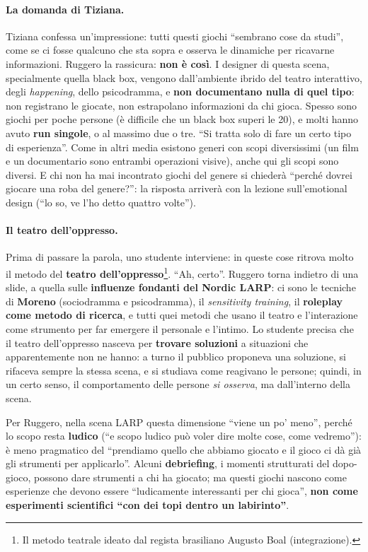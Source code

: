 \paragraph{La domanda di Tiziana.} Tiziana confessa un'impressione: tutti questi
giochi ``sembrano cose da studi'', come se ci fosse qualcuno che sta sopra e
osserva le dinamiche per ricavarne informazioni. Ruggero la rassicura: \textbf{non
è così}. I designer di questa scena, specialmente quella black box, vengono
dall'ambiente ibrido del teatro interattivo, degli \emph{happening}, dello
psicodramma, e \textbf{non documentano nulla di quel tipo}: non registrano le
giocate, non estrapolano informazioni da chi gioca. Spesso sono giochi per poche
persone (è difficile che un black box superi le 20), e molti hanno avuto
\textbf{run singole}, o al massimo due o tre. ``Si tratta solo di fare un certo
tipo di esperienza''. Come in altri media esistono generi con scopi diversissimi
(un film e un documentario sono entrambi operazioni visive), anche qui gli scopi
sono diversi. E chi non ha mai incontrato giochi del genere si chiederà
``perché dovrei giocare una roba del genere?'': la risposta arriverà con la
lezione sull'emotional design (``lo so, ve l'ho detto quattro volte'').

\paragraph{Il teatro dell'oppresso.} Prima di passare la parola, uno studente
interviene: in queste cose ritrova molto il metodo del \textbf{teatro
dell'oppresso}\footnote{Il metodo teatrale ideato dal regista brasiliano Augusto
Boal (integrazione).}. ``Ah, certo''. Ruggero torna indietro di una slide, a
quella sulle \textbf{influenze fondanti del Nordic LARP}: ci sono le tecniche di
\textbf{Moreno} (sociodramma e psicodramma), il \emph{sensitivity training}, il
\textbf{roleplay come metodo di ricerca}, e tutti quei metodi che usano il teatro
e l'interazione come strumento per far emergere il personale e l'intimo. Lo
studente precisa che il teatro dell'oppresso nasceva per \textbf{trovare
soluzioni} a situazioni che apparentemente non ne hanno: a turno il pubblico
proponeva una soluzione, si rifaceva sempre la stessa scena, e si studiava come
reagivano le persone; quindi, in un certo senso, il comportamento delle persone
\emph{si osserva}, ma dall'interno della scena.

Per Ruggero, nella scena LARP questa dimensione ``viene un po' meno'', perché lo
scopo resta \textbf{ludico} (``e scopo ludico può voler dire molte cose, come
vedremo''): è meno pragmatico del ``prendiamo quello che abbiamo giocato e il
gioco ci dà già gli strumenti per applicarlo''. Alcuni \textbf{debriefing}, i
momenti strutturati del dopo-gioco, possono dare strumenti a chi ha giocato; ma
questi giochi nascono come esperienze che devono essere ``ludicamente
interessanti per chi gioca'', \textbf{non come esperimenti scientifici ``con dei
topi dentro un labirinto''}.

